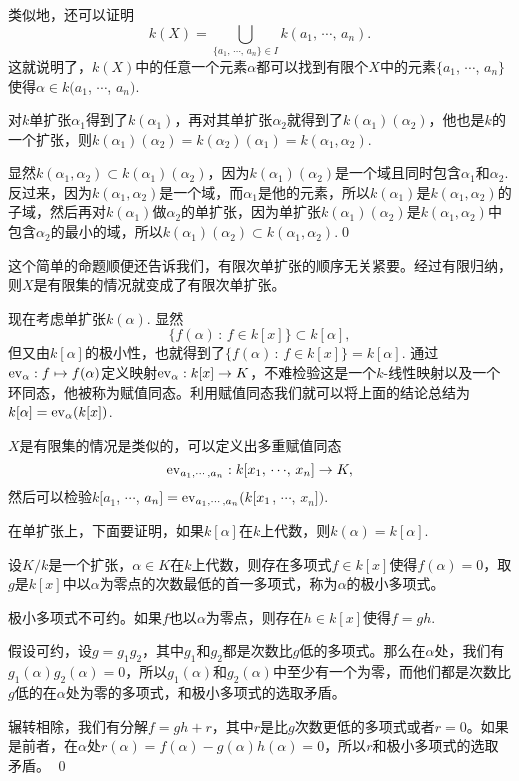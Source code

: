 类似地，还可以证明
\[
	k(X)=\bigcup_{\{a_1,\,\cdots\!,\,a_n\}\in I} k(a_1,\,\cdots\!,\,a_n).
\]
这就说明了，$k(X)$中的任意一个元素$\alpha$都可以找到有限个$X$中的元素$\{a_1$, $\cdots$, $a_n\}$使得$\alpha\in k(a_1$, $\cdots$, $a_n)$.

\pro 对$k$单扩张$\alpha_1$得到了$k(\alpha_1)$，再对其单扩张$\alpha_2$就得到了$k(\alpha_1)(\alpha_2)$，他也是$k$的一个扩张，则$k(\alpha_1)(\alpha_2)= k(\alpha_2)(\alpha_1)=k(\alpha_1,\alpha_2)$.

\proof 显然$k(\alpha_1,\alpha_2)\subset k(\alpha_1)(\alpha_2)$，因为$k(\alpha_1)(\alpha_2)$是一个域且同时包含$\alpha_1$和$\alpha_2$. 反过来，因为$k(\alpha_1,\alpha_2)$是一个域，而$\alpha_1$是他的元素，所以$k(\alpha_1)$是$k(\alpha_1,\alpha_2)$的子域，然后再对$k(\alpha_1)$做$\alpha_2$的单扩张，因为单扩张$k(\alpha_1)(\alpha_2)$是$k(\alpha_1,\alpha_2)$中包含$\alpha_2$的最小的域，所以$k(\alpha_1)(\alpha_2)\subset k(\alpha_1,\alpha_2)$.\qed

这个简单的命题顺便还告诉我们，有限次单扩张的顺序无关紧要。经过有限归纳，则$X$是有限集的情况就变成了有限次单扩张。

\para 现在考虑单扩张$k(\alpha)$. 显然
\[
	\{f(\alpha)\,:\, f\in k[x]\}\subset k[\alpha],
\]
但又由$k[\alpha]$的极小性，也就得到了$\{f(\alpha)\,:\, f\in k[x]\}=k[\alpha]$. 通过$\operatorname{ev}_{\alpha}:f\mapsto f(\alpha)$定义映射$\operatorname{ev}_{\alpha}:k[x]\to K$，不难检验这是一个$k$-线性映射以及一个环同态，他被称为赋值同态。利用赋值同态我们就可以将上面的结论总结为$k[\alpha]=\operatorname{ev}_{\alpha}(k[x])$.

$X$是有限集的情况是类似的，可以定义出多重赋值同态
\[
	\operatorname{ev}_{a_1,\cdots,a_n}:k[x_1,\,\cdots\!,\,x_n]\to K,
\]
然后可以检验$k[a_1$, $\cdots$, $a_n]=\operatorname{ev}_{a_1,\cdots,a_n}(k[x_1$, $\cdots$, $x_n])$.

在单扩张上，下面要证明，如果$k[\alpha]$在$k$上代数，则$k(\alpha)=k[\alpha]$.

\para 设$K/k$是一个扩张，$\alpha\in K$在$k$上代数，则存在多项式$f\in k[x]$使得$f(\alpha)=0$，取$g$是$k[x]$中以$\alpha$为零点的次数最低的首一多项式，称为$\alpha$的极小多项式。

\lem 极小多项式不可约。如果$f$也以$\alpha$为零点，则存在$h\in k[x]$使得$f=gh$.

\proof 
	假设可约，设$g=g_1g_2$，其中$g_1$和$g_2$都是次数比$g$低的多项式。那么在$\alpha$处，我们有$g_1(\alpha)g_2(\alpha)=0$，所以$g_1(\alpha)$和$g_2(\alpha)$中至少有一个为零，而他们都是次数比$g$低的在$\alpha$处为零的多项式，和极小多项式的选取矛盾。

	辗转相除，我们有分解$f=gh+r$，其中$r$是比$g$次数更低的多项式或者$r=0$。如果是前者，在$\alpha$处$r(\alpha)=f(\alpha)-g(\alpha)h(\alpha)=0$，所以$r$和极小多项式的选取矛盾。
\qed

